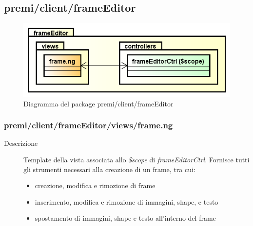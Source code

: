 \clearpage
\subsection{premi/client/frameEditor}
\begin{figure}[H]
\begin{center}
\includegraphics[scale=0.55]{img/diapkg/frameEditor.png}
\caption{Diagramma del package premi/client/frameEditor}
\end{center}
\end{figure}

\subsubsection{premi/client/frameEditor/views/frame.ng}

\begin{description}
\item[Descrizione] \hfill
	Template della vista associata allo \textit{\$scope} di \textit{frameEditorCtrl}. Fornisce tutti gli strumenti necessari alla creazione di un frame, tra cui:
	\begin{itemize}
			\item creazione, modifica e rimozione di frame
			\item inserimento, modifica e rimozione di immagini, shape, e testo
			\item spostamento di immagini, shape  e testo all'interno del frame
	\end{itemize}
\end{description}








